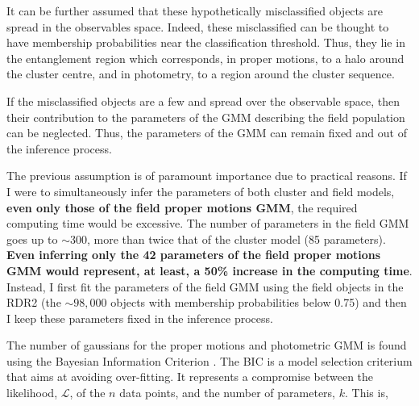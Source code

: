 {\color{blue}
It can be further assumed that these hypothetically misclassified objects are spread in the observables space. Indeed, these misclassified can be thought to have membership probabilities near the classification threshold. Thus, they lie in the entanglement region which corresponds, in proper motions, to a halo around the cluster centre, and in photometry, to a region around the cluster sequence.
}

If the misclassified objects are a few and spread over the observable space, then their contribution to the parameters of the GMM describing the field population can be neglected. Thus, the parameters of the GMM can remain fixed and out of the inference process. 

The previous assumption is of paramount importance due to practical reasons. If I were to simultaneously infer the parameters of both cluster and field models, \textbf{even only those of the field proper motions GMM}, the required computing time would be excessive. The number of parameters in the field GMM goes up to $\sim 300$, more than twice that of the cluster model (85 parameters). \textbf{Even inferring only the 42 parameters of the field proper motions GMM would represent, at least, a 50\% increase in the computing time}. Instead, I first fit the parameters of the field GMM using the field objects in the RDR2 (the $\sim 98,000$ objects with membership probabilities below 0.75) and then I keep these parameters fixed in the inference process.   

The number of gaussians for the proper motions and photometric GMM is found using the Bayesian Information Criterion \cite[BIC,][]{Schwarz1978}. The BIC is a model selection criterium that aims at avoiding over-fitting. It represents a compromise between the likelihood, $\mathcal{L}$, of the $n$ data points, and the number of parameters, $k$. This is,

